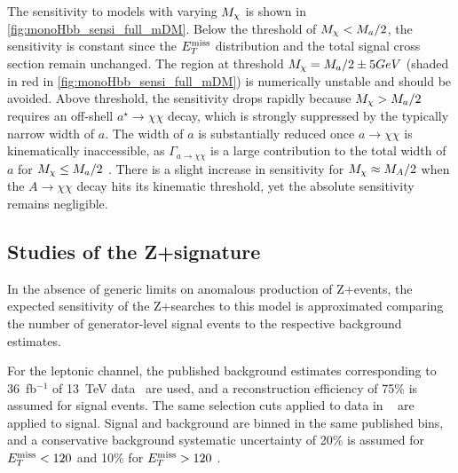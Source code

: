 The sensitivity to models with varying $M_{\chi}$ is shown in  \autoref{fig:monoHbb_sensi_full_mDM}.
Below the threshold of $M_{\chi} < M_{a}/2$, the sensitivity is constant since the $E_T^\mathrm{miss}$ distribution and the total signal cross section remain unchanged.%
The region at threshold $M_{\chi} = M_{a}/2 \pm 5 GeV$ (shaded in red in \autoref{fig:monoHbb_sensi_full_mDM}) is numerically unstable and should be avoided. 
Above threshold, the sensitivity drops rapidly because $M_{\chi} > M_{a}/2$ requires an off-shell $a^{\star} \to \chi\chi$ decay, which is strongly suppressed by the typically narrow width of $a$. 
The width of $a$ is substantially reduced once $a\to \chi \chi$ is kinematically inaccessible, as $\Gamma_{a\to \chi \chi}$ is a large contribution to the total width of $a$ for $M_{\chi} \leq M_{a}/2$ \cite{Bauer:2017ota}.
There is a slight increase in sensitivity for $M_{\chi} \approx M_{A}/2$ when the $A\to \chi\chi$ decay hits its kinematic threshold, yet the absolute sensitivity remains negligible.

\FloatBarrier

\subsection{Studies of the Z+\MET signature}

In the absence of generic limits on anomalous production of Z+\MET events, the expected sensitivity of the Z+\MET  searches to this model is approximated comparing the number of generator-level signal events to the respective background estimates. 

For the leptonic channel, the published background estimates corresponding to 36~fb$^{-1}$ of 13~TeV data~\cite{Aaboud:2017bja} are used, and a reconstruction efficiency of 75\% is assumed for signal events. 
The same selection cuts applied to data in ~\cite{Aaboud:2017bja} are applied to signal. 
Signal and background are binned in the same published \MET bins, and a conservative background systematic uncertainty of 20\% is assumed for $E_T^\mathrm{miss} < 120$ \GeV and 10\% for $E_T^\mathrm{miss} > 120$ \GeV. 

